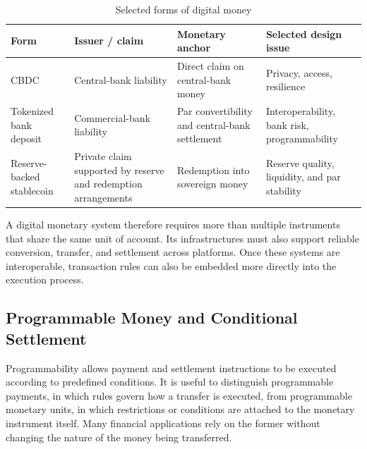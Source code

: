 \begin{table}[H]

\centering

\caption{Selected forms of digital money}

\label{tab:ch24-digital-money}

\begin{tabularx}{\textwidth}{@{}p{3.2cm}YYY@{}}

\toprule

\textbf{Form} &
\textbf{Issuer / claim} &
\textbf{Monetary anchor} &
\textbf{Selected design issue} \\

\midrule

CBDC &
Central-bank liability &
Direct claim on central-bank money &
Privacy, access, resilience \\

Tokenized bank deposit &
Commercial-bank liability &
Par convertibility and central-bank settlement &
Interoperability, bank risk, programmability \\

Reserve-backed stablecoin &
Private claim supported by reserve and redemption arrangements &
Redemption into sovereign money &
Reserve quality, liquidity, and par stability \\

\bottomrule

\end{tabularx}

\end{table}

A digital monetary system therefore requires more than multiple instruments that share the same unit of account. Its infrastructures must also support reliable conversion, transfer, and settlement across platforms. Once these systems are interoperable, transaction rules can also be embedded more directly into the execution process.


\subsection{Programmable Money and Conditional Settlement}

Programmability allows payment and settlement instructions to be executed according to predefined conditions. It is useful to distinguish programmable payments, in which rules govern how a transfer is executed, from programmable monetary units, in which restrictions or conditions are attached to the monetary instrument itself. Many financial applications rely on the former without changing the nature of the money being transferred.

